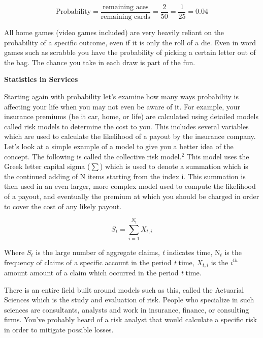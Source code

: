 \documentclass[11pt]{article}
\begin{document}
\bigskip
\color{OliveGreen}
$$ \text{Probability} = \frac{\text{remaining aces}}{\text{remaining cards}} = \frac{2}{50} = \frac{1}{25} = 0.04 $$
\color{black}
\bigskip

All home games (video games included) are very heavily reliant on the probability of a specific outcome, even if it is only the roll of a die. Even in word games such as scrabble you have the probability of picking a certain letter out of the bag. The chance you take in each draw is part of the fun.

\newpage

\noindent \color{RoyalPurple} \textbf{\large Statistics in Services}

\color{black}
\bigskip

Starting again with probability let's examine how many ways probability is affecting your life when you may not even be aware of it. For example, your insurance premiums (be it car, home, or life) are calculated using detailed models called risk models to determine the cost to you. This includes several variables which are used to calculate the likelihood of a payout by the insurance company. Let's look at a simple example of a model to give you a better idea of the concept. The following is called the collective risk model.$^2$ This model uses the Greek letter capital sigma ($\sum$) which is used to denote a summation which is the continued adding of N items starting from the index i. This summation is then used in an even larger, more complex model used to compute the likelihood of a payout, and eventually the premium at which you should be charged in order to cover the cost of any likely payout. \color{OliveGreen}

$$ S_t = \sum_{i=1}^{N_t}X_{t,i} $$

\noindent Where $S_t$ is the large number of aggregate claims,  \textit{t} indicates time, N$_t$ is the frequency of claims of a specific account in the period \textit{t} time, $X_{t,i}$ is the $i^{th}$ amount amount of a claim which occurred in the period \textit{t} time.

\bigskip	
\color{black}	
There is an entire field built around models such as this, called the Actuarial Sciences which is the study and evaluation of risk. People who specialize in such sciences are consultants, analysts and work in insurance, finance, or consulting firms. You've probably heard of a risk analyst that would calculate a specific risk in order to mitigate possible losses. 

\bigskip
\end{document}

